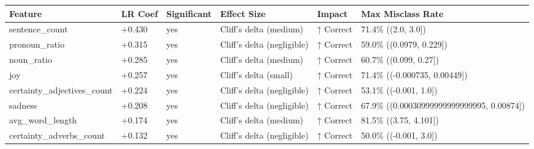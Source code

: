 \begin{tabular}{llllll}
\toprule
Feature & LR Coef & Significant & Effect Size & Impact & Max Misclass Rate \\
\midrule
sentence\_count & +0.430 & yes & Cliff's delta (medium) & ↑ Correct & 71.4\% ((2.0, 3.0]) \\
pronoun\_ratio & +0.315 & yes & Cliff's delta (negligible) & ↑ Correct & 59.0\% ((0.0979, 0.229]) \\
noun\_ratio & +0.285 & yes & Cliff's delta (medium) & ↑ Correct & 60.7\% ((0.099, 0.27]) \\
joy & +0.257 & yes & Cliff's delta (small) & ↑ Correct & 71.4\% ((-0.000735, 0.00449]) \\
certainty\_adjectives\_count & +0.224 & yes & Cliff's delta (negligible) & ↑ Correct & 53.1\% ((-0.001, 1.0]) \\
sadness & +0.208 & yes & Cliff's delta (negligible) & ↑ Correct & 67.9\% ((0.00030999999999999995, 0.00874]) \\
avg\_word\_length & +0.174 & yes & Cliff's delta (medium) & ↑ Correct & 81.5\% ((3.75, 4.101]) \\
certainty\_adverbs\_count & +0.132 & yes & Cliff's delta (negligible) & ↑ Correct & 50.0\% ((-0.001, 3.0]) \\
\bottomrule
\end{tabular}

